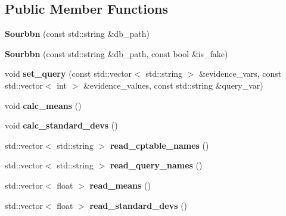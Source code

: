 \subsection*{Public Member Functions}
\begin{DoxyCompactItemize}
\item 
\mbox{\label{classsourbbn_1_1Sourbbn_ae2391646e2d6b6e4f2e7590657749d24}} 
{\bfseries Sourbbn} (const std\+::string \&db\+\_\+path)
\item 
\mbox{\label{classsourbbn_1_1Sourbbn_a79ea565caf343ceabb68b041f3fe81be}} 
{\bfseries Sourbbn} (const std\+::string \&db\+\_\+path, const bool \&is\+\_\+fake)
\item 
\mbox{\label{classsourbbn_1_1Sourbbn_a4a4a5864d833c146b85b1cf1b4ff9613}} 
void {\bfseries set\+\_\+query} (const std\+::vector$<$ std\+::string $>$ \&evidence\+\_\+vars, const std\+::vector$<$ int $>$ \&evidence\+\_\+values, const std\+::string \&query\+\_\+var)
\item 
\mbox{\label{classsourbbn_1_1Sourbbn_a6f65dc05a317828e2775f912ec47a4d8}} 
void {\bfseries calc\+\_\+means} ()
\item 
\mbox{\label{classsourbbn_1_1Sourbbn_afe85fa00cd552fea0143c8dae0190a24}} 
void {\bfseries calc\+\_\+standard\+\_\+devs} ()
\item 
\mbox{\label{classsourbbn_1_1Sourbbn_ab5d7141042555a025b259c615edc2ab0}} 
std\+::vector$<$ std\+::string $>$ {\bfseries read\+\_\+cptable\+\_\+names} ()
\item 
\mbox{\label{classsourbbn_1_1Sourbbn_a4e760d83eae905d21197ab9656d5fb85}} 
std\+::vector$<$ std\+::string $>$ {\bfseries read\+\_\+query\+\_\+names} ()
\item 
\mbox{\label{classsourbbn_1_1Sourbbn_a48c6f3bb0e4490c20e4ff78b4a845c84}} 
std\+::vector$<$ float $>$ {\bfseries read\+\_\+means} ()
\item 
\mbox{\label{classsourbbn_1_1Sourbbn_abaf63f4da93153b1e1588b0b6f497083}} 
std\+::vector$<$ float $>$ {\bfseries read\+\_\+standard\+\_\+devs} ()
\end{DoxyCompactItemize}


